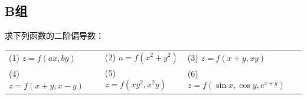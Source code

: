 \documentclass[lang=cn,11pt]{elegantbook}
\begin{document}
\subsection{B组}

\begin{exercise}[抽象函数的二阶偏导数]
求下列函数的二阶偏导数：
\begin{center}
\begin{tabular}{p{} p{} p{}}
(1) $z = f(ax,by)$ & (2) $u = f(x^2+y^2)$ & (3) $z = f(x+y,xy)$ \\
(4) $z = f(x+y,x-y)$ & (5) $z = f(xy^2,x^2y)$ & (6) $z = f(\sin x,\cos y,e^{x+y})$
\end{tabular}
\end{center}
\end{exercise}
\end{document}
